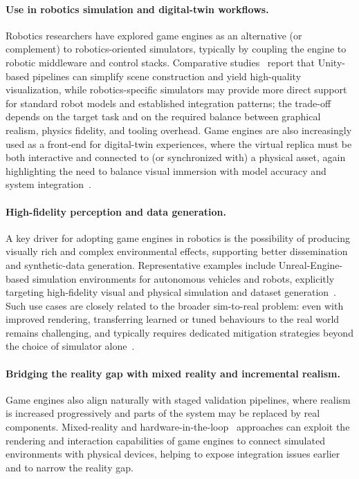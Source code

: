 \documentclass[runningheads]{llncs}
\begin{document}
\paragraph{Use in robotics simulation and digital-twin workflows.}
Robotics researchers have explored game engines as an alternative (or complement) to
robotics-oriented simulators, typically by coupling the engine to robotic middleware and
control stacks.
%
Comparative studies~\cite{DBLP:journals/jirs/PlattR22,DBLP:journals/simpra/WijayaCPKG24,DBLP:journals/simpra/FarleyWM22}
report that Unity-based pipelines can simplify scene construction and yield
high-quality visualization, while robotics-specific simulators may provide more direct support
for standard robot models and established integration patterns; the trade-off depends on the
target task and on the required balance between graphical realism, physics fidelity, and tooling
overhead.
%
Game engines are also increasingly used as a front-end for digital-twin experiences, where the
virtual replica must be both interactive and connected to (or synchronized with) a physical asset,
again highlighting the need to balance visual immersion with model accuracy and system
integration~\cite{Singh2025UnityGazeboDT}.
%

\paragraph{High-fidelity perception and data generation.}
A key driver for adopting game engines in robotics is the possibility of producing
visually rich and complex environmental effects,
supporting better dissemination and synthetic-data generation.
%
Representative examples include Unreal-Engine-based simulation environments for autonomous
vehicles and robots, explicitly targeting high-fidelity visual and physical simulation and
dataset generation~\cite{DBLP:conf/fsr/ShahDLK17,Wolf2020}.
%
Such use cases are closely related to the broader sim-to-real problem:
even with improved
rendering, transferring learned or tuned behaviours to the real world remains challenging,
and typically requires dedicated mitigation strategies
beyond the choice of simulator alone~\cite{DBLP:journals/natmi/JuJGNL22}.

\paragraph{Bridging the reality gap with mixed reality and incremental realism.}

Game engines also align naturally with staged validation pipelines, where realism is increased
progressively and parts of the system may be replaced by real components.
%
Mixed-reality and hardware-in-the-loop~\cite{Sende2024} approaches can exploit the rendering and interaction
capabilities of game engines to connect simulated environments with physical devices, helping
to expose integration issues earlier and to narrow the reality gap.
\end{document}
